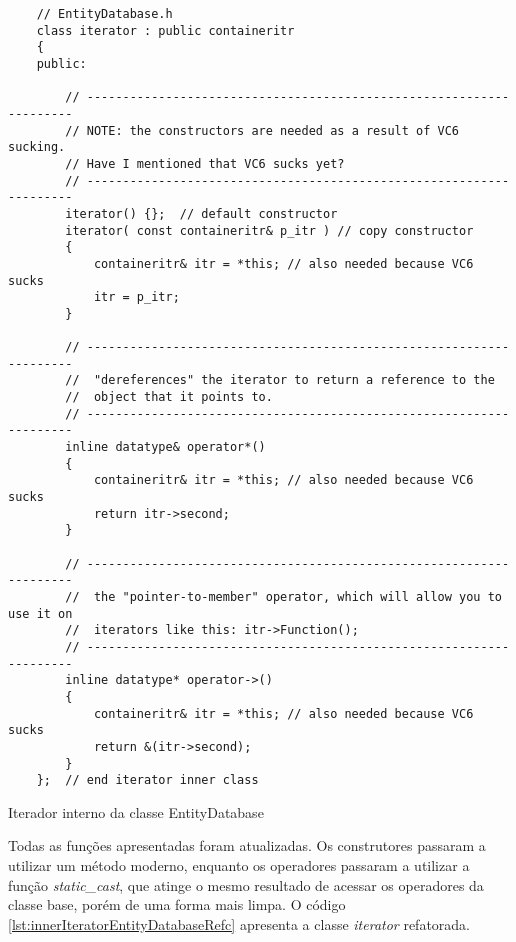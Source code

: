 \begin{listing}[!ht]
    \begin{verbatim}
    // EntityDatabase.h
    class iterator : public containeritr
    {
    public:

        // --------------------------------------------------------------------
        // NOTE: the constructors are needed as a result of VC6 sucking.
        // Have I mentioned that VC6 sucks yet?
        // --------------------------------------------------------------------
        iterator() {};  // default constructor
        iterator( const containeritr& p_itr ) // copy constructor
        {
            containeritr& itr = *this; // also needed because VC6 sucks
            itr = p_itr;
        }

        // --------------------------------------------------------------------
        //  "dereferences" the iterator to return a reference to the
        //  object that it points to.
        // --------------------------------------------------------------------
        inline datatype& operator*()
        {
            containeritr& itr = *this; // also needed because VC6 sucks
            return itr->second;
        }

        // --------------------------------------------------------------------
        //  the "pointer-to-member" operator, which will allow you to use it on
        //  iterators like this: itr->Function();
        // --------------------------------------------------------------------
        inline datatype* operator->()
        {
            containeritr& itr = *this; // also needed because VC6 sucks
            return &(itr->second);
        }
    };  // end iterator inner class
    \end{verbatim}
\caption{Iterador interno da classe EntityDatabase}
\label{lst:innerIteratorEntityDatabase}
\end{listing}

Todas as funções apresentadas foram atualizadas. Os construtores passaram a utilizar um 
método moderno, enquanto os operadores passaram a utilizar a função \textit{static\_cast}, 
que atinge o mesmo resultado de acessar os operadores da classe base, porém de uma forma mais limpa. 
O código \ref{lst:innerIteratorEntityDatabaseRefc} apresenta a classe \textit{iterator} 
refatorada.

